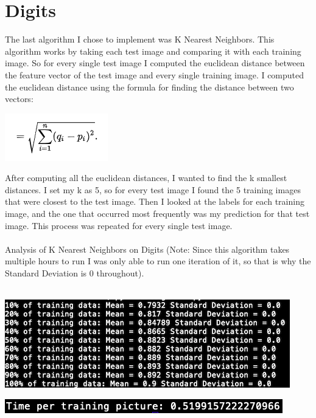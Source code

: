 \documentclass[12pt]{article}
\begin{document}
\section*{Digits}
The last algorithm I chose to implement was K Nearest Neighbors. This algorithm works by taking each test image and comparing it with each training image. So for every single test image I computed the euclidean distance between the feature vector of the test image and every single training image. I computed the euclidean distance using the formula for finding the distance between two vectors:\\
\begin{center}
\includegraphics{euclideanDistance.png}
\end{center}
After computing all the euclidean distances, I wanted to find the k smallest distances. I set my k as 5, so for every test image I found the 5 training images that were closest to the test image. Then I looked at the labels for each training image, and the one that occurred most frequently was my prediction for that test image. This process was repeated for every single test image.\\\\
Analysis of K Nearest Neighbors on Digits (Note: Since this algorithm takes multiple hours to run I was only able to run one iteration of it, so that is why the Standard Deviation is 0 throughout).\\\\

\begin{center}
\includegraphics{statsDigKnn.png}
\end{center}

\begin{center}
\includegraphics{timeStatsDigKnn.png}
\end{center}
\end{document}
